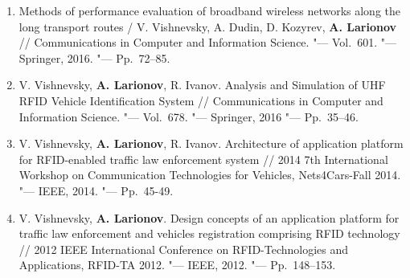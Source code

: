 \begin{frame}
\begin{enumerate}
        \item Methods of performance evaluation of broadband wireless networks along the long transport routes / V. Vishnevsky, A. Dudin, D. Kozyrev, \textbf{A. Larionov} // Communications in Computer and Information Science. "--- Vol.~601. "--- Springer, 2016. "--- Pp.~72--85.
        \item V. Vishnevsky, \textbf{A. Larionov}, R. Ivanov. Analysis and Simulation of UHF RFID Vehicle Identification System // Communications in Computer and Information Science. "--- Vol.~678. "--- Springer, 2016 "--- Pp.~35--46.
        \item V. Vishnevsky, \textbf{A. Larionov}, R. Ivanov. Architecture of application platform for RFID-enabled traffic law enforcement system // 2014 7th International Workshop on Communication Technologies for Vehicles, Nets4Cars-Fall 2014. "--- IEEE, 2014. "--- Pp.~45-49.
        \item V. Vishnevsky, \textbf{A. Larionov}. Design concepts of an application platform for traffic law enforcement and vehicles registration comprising RFID technology // 2012 IEEE International Conference on RFID-Technologies and Applications, RFID-TA 2012. "--- IEEE, 2012. "--- Pp.~148--153.
    \end{enumerate}
\end{frame}






